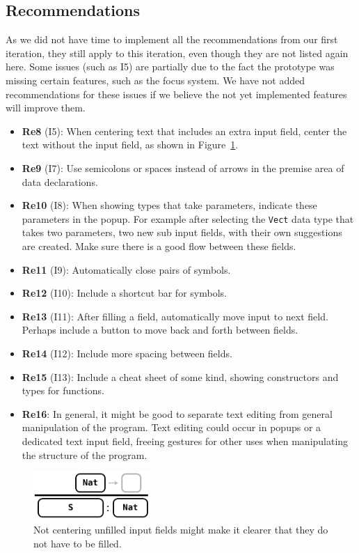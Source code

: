 \subsection{Recommendations}
\label{sec:second_recommendations}
As we did not have time to implement all the recommendations from our first iteration, they still apply to this iteration, even though they are not listed again here.
Some issues (such as I5) are partially due to the fact the prototype was missing certain features, such as the focus system.
We have not added recommendations for these issues if we believe the not yet implemented features will improve them.

\begin{itemize}
    \item \textbf{Re8} (I5): When centering text that includes an extra input field, center the text without the input field, as shown in Figure~\ref{fig:centeredFields}.
    \item \textbf{Re9} (I7): Use semicolons or spaces instead of arrows in the premise area of data declarations.
    \item \textbf{Re10} (I8): When showing types that take parameters, indicate these parameters in the popup. For example after selecting the \texttt{Vect} data type that takes two parameters, two new sub input fields, with their own suggestions are created. Make sure there is a good flow between these fields.
    \item \textbf{Re11} (I9): Automatically close pairs of symbols.
    \item \textbf{Re12} (I10): Include a shortcut bar for symbols.
    \item \textbf{Re13} (I11): After filling a field, automatically move input to next field. Perhaps include a button to move back and forth between fields.
    \item \textbf{Re14} (I12): Include more spacing between fields.
    \item \textbf{Re15} (I13): Include a cheat sheet of some kind, showing constructors and types for functions.
    \item \textbf{Re16}: In general, it might be good to separate text editing from general manipulation of the program. Text editing could occur in popups or a dedicated text input field, freeing gestures for other uses when manipulating the structure of the program.
\end{itemize}

\begin{figure}[h]
	\centering
		\includegraphics[width=45mm]{diagrams/CenteredPremise.PNG}
	\caption{Not centering unfilled input fields might make it clearer that they do not have to be filled.}
\label{fig:centeredFields}
\end{figure}

